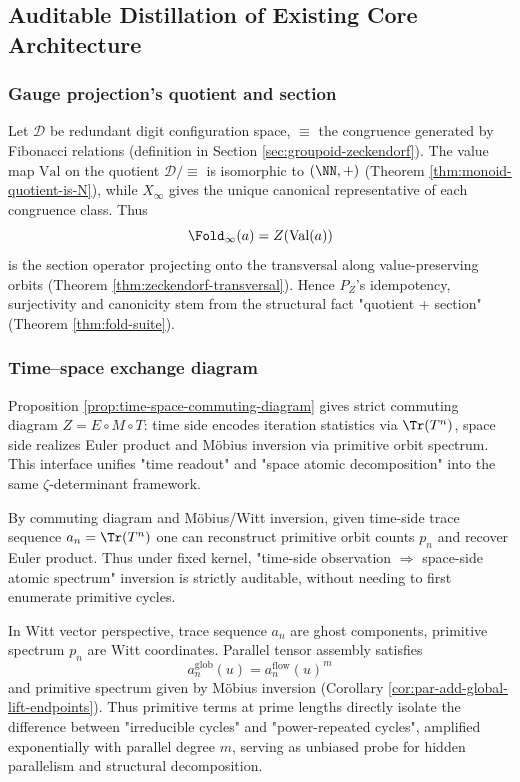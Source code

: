 \subsection{Auditable Distillation of Existing Core Architecture}\label{subsec:pom-hard-skeleton}
\subsubsection{Gauge projection's quotient and section}\label{subsec:pom-quotient-section}
Let $\mathcal{D}$ be redundant digit configuration space, $\equiv$ the congruence generated by Fibonacci relations (definition in Section \ref{sec:groupoid-zeckendorf}). The value map $\mathrm{Val}$ on the quotient $\mathcal{D}/\!\equiv$ is isomorphic to $(\NN,+)$ (Theorem \ref{thm:monoid-quotient-is-N}), while $X_\infty$ gives the unique canonical representative of each congruence class. Thus
\[
\Fold_\infty(a)=Z(\mathrm{Val}(a))
\]
is the section operator projecting onto the transversal along value-preserving orbits (Theorem \ref{thm:zeckendorf-transversal}). Hence $P_Z$'s idempotency, surjectivity and canonicity stem from the structural fact "quotient + section" (Theorem \ref{thm:fold-suite}).

\subsubsection{Time–space exchange diagram}\label{subsec:pom-time-space-diagram}
Proposition \ref{prop:time-space-commuting-diagram} gives strict commuting diagram $Z=E\circ M\circ T$: time side encodes iteration statistics via $\Tr(T^n)$, space side realizes Euler product and Möbius inversion via primitive orbit spectrum. This interface unifies "time readout" and "space atomic decomposition" into the same $\zeta$-determinant framework.

\begin{remark}\label{rem:pom-trace-to-prime}
By commuting diagram and Möbius/Witt inversion, given time-side trace sequence $a_n=\Tr(T^n)$ one can reconstruct primitive orbit counts $p_n$ and recover Euler product. Thus under fixed kernel, "time-side observation $\Rightarrow$ space-side atomic spectrum" inversion is strictly auditable, without needing to first enumerate primitive cycles.
\end{remark}

\begin{remark}\label{rem:pom-witt-amplifier}
In Witt vector perspective, trace sequence $a_n$ are ghost components, primitive spectrum $p_n$ are Witt coordinates. Parallel tensor assembly satisfies
\[
a_n^{\mathrm{glob}}(u)=a_n^{\mathrm{flow}}(u)^m
\]
and primitive spectrum given by Möbius inversion (Corollary \ref{cor:par-add-global-lift-endpoints}). Thus primitive terms at prime lengths directly isolate the difference between "irreducible cycles" and "power-repeated cycles", amplified exponentially with parallel degree $m$, serving as unbiased probe for hidden parallelism and structural decomposition.
\end{remark}

